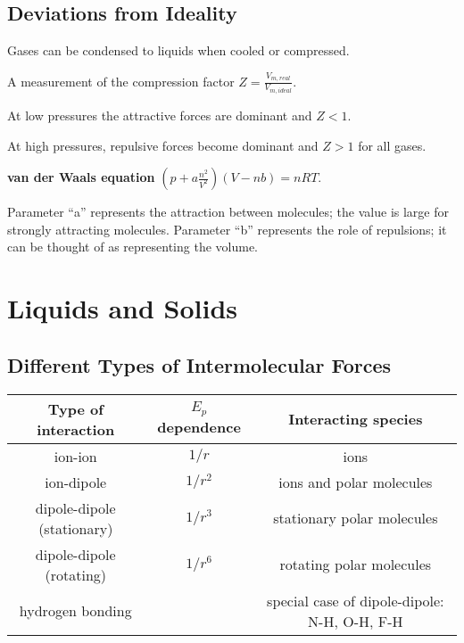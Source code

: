 \documentclass[a4paper,12pt]{article}
\begin{document}
\subsection{Deviations from Ideality}
Gases can be condensed to liquids when cooled or compressed.\par
A measurement of the compression factor $Z=\frac{V_{m, real}}{V_{m, ideal}}$.\par
At low pressures the attractive forces are dominant and $Z<1$.\par
At high pressures, repulsive forces become dominant and $Z>1$ for all gases.\par
\textbf{van der Waals equation} 
$(p+a\frac{n^{2}}{V^{2}})(V-nb)=nRT$.\par
Parameter “a” represents the attraction between molecules; the value is large for strongly attracting molecules.
Parameter “b” represents the role of repulsions; it can be thought of as representing the volume.

\newpage
\section{Liquids and Solids}
\subsection{Different Types of Intermolecular Forces}
\begin{center}
  \begin{tabular}{ccc}
    \toprule
    Type of interaction & $E_{p}$ dependence & Interacting species \\
    \hline
    ion-ion    & $1/r$  & ions  \\
    ion-dipole  & $1/r^{2}$  & ions and polar molecules  \\
    dipole-dipole (stationary)  & $1/r^{3}$  & stationary polar molecules  \\
    dipole-dipole (rotating)  & $1/r^{6}$  &rotating polar molecules  \\
    hydrogen bonding &   &special case of dipole-dipole: N-H, O-H, F-H  \\
    \bottomrule
  \end{tabular}
\end{center}
\end{document}
